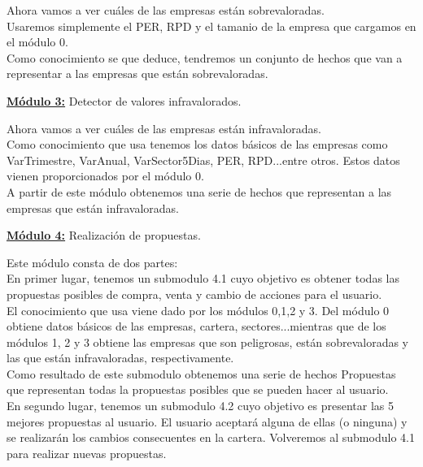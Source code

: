 \documentclass[12pt]{article}
\begin{document}
Ahora vamos a ver cuáles de las empresas están sobrevaloradas. \\

Usaremos simplemente el PER, RPD y el tamanio de la empresa que cargamos en el módulo 0.\\

Como conocimiento se que deduce, tendremos un conjunto de hechos que van a representar a las empresas que están sobrevaloradas. \\


\begin{center}
	\underline{\textbf{Módulo 3:}} Detector de valores infravalorados.
\end{center}
 
 Ahora vamos a ver cuáles de las empresas están infravaloradas. \\
 
 Como conocimiento que usa tenemos los datos básicos de las empresas como VarTrimestre, VarAnual, VarSector5Dias, PER, RPD...entre otros. Estos datos vienen proporcionados por el módulo 0.\\
 
 A partir de este módulo obtenemos una serie de hechos que representan a las empresas que están infravaloradas. 

\newpage
\begin{center}
	\underline{\textbf{Módulo 4:}} Realización de propuestas.
\end{center}
Este módulo consta de dos partes:\\

En primer lugar, tenemos un submodulo 4.1 cuyo objetivo es obtener todas las propuestas posibles de compra, venta y cambio de acciones para el usuario.\\

El conocimiento que usa viene dado por los módulos 0,1,2 y 3. Del módulo 0 obtiene datos básicos de las empresas, cartera, sectores...mientras que de los módulos 1, 2 y 3 obtiene las empresas que son peligrosas, están sobrevaloradas y las que están  infravaloradas, respectivamente. \\

Como resultado de este submodulo obtenemos una serie de hechos Propuestas que representan todas la propuestas posibles que se pueden hacer al usuario. \\

En segundo lugar, tenemos un submodulo 4.2 cuyo objetivo es presentar las 5 mejores propuestas al usuario. El usuario aceptará alguna de ellas (o ninguna) y se realizarán los cambios consecuentes en la cartera. Volveremos al submodulo 4.1 para realizar nuevas propuestas.\\
\end{document}
